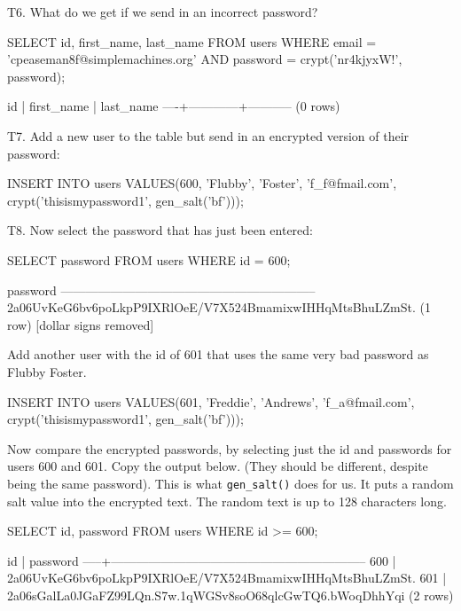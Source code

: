 T6. What do we get if we send in an incorrect password?
\begin{sql}
SELECT id,
   	first_name,
   	last_name
FROM users
WHERE email = 'cpeaseman8f@simplemachines.org'
  AND password = crypt('nr4kjyxW!', password);
\end{sql}
\begin{pseudo*}
 id | first_name | last_name
----+------------+-----------
(0 rows)
\end{pseudo*}

T7. Add a new user to the table but send in an encrypted version of their password:
\begin{sql}
INSERT INTO users
VALUES(600,
   	'Flubby',
   	'Foster',
   	'f_f@fmail.com',
   	crypt('thisismypassword1', gen_salt('bf')));
\end{sql}

T8. Now select the password that has just been entered:
\begin{sql}
SELECT password
FROM users
WHERE id = 600;
\end{sql}
\begin{pseudo*}
                           password
--------------------------------------------------------------
 2a06UvKeG6bv6poLkpP9IXRlOeE/V7X524BmamixwIHHqMtsBhuLZmSt.
(1 row)
[dollar signs removed]
\end{pseudo*}
Add another user with the id of 601 that uses the same very bad password as Flubby Foster.
\begin{sql}
    INSERT INTO users
    VALUES(601,
           'Freddie',
           'Andrews',
           'f_a@fmail.com',
           crypt('thisismypassword1', gen_salt('bf')));
\end{sql}
Now compare the encrypted passwords, by selecting just the id and passwords for users 600 and 601. Copy the output below. (They should be different, despite being the same password). This is what \verb|gen_salt()| does for us. It puts a random salt value into the encrypted text. The random text is up to 128 characters long. 
\begin{sql}
SELECT id, password
FROM users
WHERE id >= 600;
\end{sql}
\begin{pseudo}
 id  |                           password
-----+--------------------------------------------------------------
 600 | 2a06UvKeG6bv6poLkpP9IXRlOeE/V7X524BmamixwIHHqMtsBhuLZmSt.
 601 | 2a06sGalLa0JGaFZ99LQn.S7w.1qWGSv8soO68qlcGwTQ6.bWoqDhhYqi
(2 rows)
\end{pseudo}

